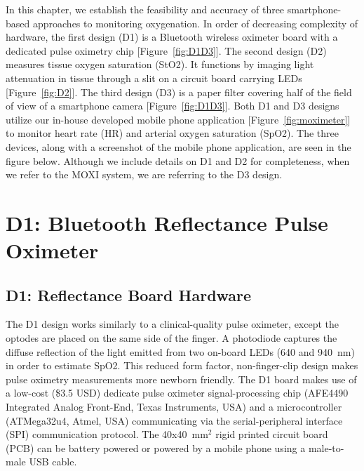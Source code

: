 In this chapter, we establish the feasibility and accuracy of three smartphone-based approaches to monitoring oxygenation. In order of decreasing complexity of hardware, the first design (D1) is a Bluetooth wireless oximeter board with a dedicated pulse oximetry chip [Figure~\ref{fig:D1D3}]. The second design (D2) measures tissue oxygen saturation (StO2). It functions by imaging light attenuation in tissue through a slit on a circuit board carrying LEDs [Figure~\ref{fig:D2}]. The third design (D3) is a paper filter covering half of the field of view of a smartphone camera [Figure~\ref{fig:D1D3}]. Both D1 and D3 designs utilize our in-house developed mobile phone application [Figure~\ref{fig:moximeter}] to monitor heart rate (HR) and arterial oxygen saturation (SpO2). The three devices, along with a screenshot of the mobile phone application, are seen in the figure below. Although we include details on D1 and D2 for completeness, when we refer to the \ac{MOXI} system, we are referring to the D3 design. 



\section{D1: Bluetooth Reflectance Pulse Oximeter}
\subsection{D1: Reflectance Board Hardware}
The D1 design works similarly to a clinical-quality pulse oximeter, except the optodes are placed on the same side of the finger. A photodiode captures the diffuse reflection of the light emitted from two on-board LEDs (640 and 940~nm) in order to estimate SpO2. This reduced form factor, non-finger-clip design makes pulse oximetry measurements more newborn friendly. The D1 board makes use of a low-cost (\$3.5 USD) dedicate pulse oximeter signal-processing chip (AFE4490 Integrated Analog Front-End, Texas Instruments, USA) and a microcontroller (ATMega32u4, Atmel, USA) communicating via the serial-peripheral interface (SPI) communication protocol. The 40x40~mm$^2$ rigid printed circuit board (PCB) can be battery powered or powered by a mobile phone using a male-to-male USB cable. 
    
